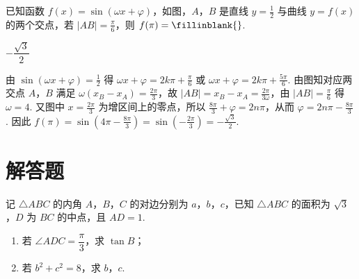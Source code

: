\begin{problem}
已知函数 \(f(x)=\sin(\omega x+\varphi)\)，如图，\(A\)，\(B\) 是直线 \(y=\frac12\) 与曲线 \(y=f(x)\) 的两个交点，若 \(|AB|=\frac{\pi}{6}\)，则 \(f(\pi)=\fillinblank{}\).

\end{problem}

\begin{answer}
\(-\dfrac{\sqrt3}{2}\)
\end{answer}

\begin{solution}
由 \(\sin(\omega x+\varphi)=\frac12\) 得
\(\omega x+\varphi=2k\pi+\frac{\pi}{6}\) 或 \(\omega x+\varphi=2k\pi+\frac{5\pi}{6}\).
由图知对应两交点 \(A\)，\(B\) 满足 \(\omega(x_B-x_A)=\frac{2\pi}{3}\)，故 \(|AB|=x_B-x_A=\frac{2\pi}{3\omega}\)，由 \(|AB|=\frac{\pi}{6}\) 得 \(\omega=4\).
又图中 \(x=\frac{2\pi}{3}\) 为增区间上的零点，所以 \(\frac{8\pi}{3}+\varphi=2n\pi\)，从而 \(\varphi=2n\pi-\frac{8\pi}{3}\).
因此
\(f(\pi)=\sin\left(4\pi-\frac{8\pi}{3}\right)=\sin\left(-\frac{2\pi}{3}\right)=-\frac{\sqrt3}{2}\).

\end{solution}
\section{解答题}

\begin{problem}
记 \(\triangle ABC\) 的内角 \(A\)，\(B\)，\(C\) 的对边分别为 \(a\)，\(b\)，\(c\)，已知 \(\triangle ABC\) 的面积为 \(\sqrt3\)，\(D\) 为 \(BC\) 的中点，且 \(AD=1\).

\begin{enumerate}
\item 若 \(\angle ADC=\dfrac{\pi}{3}\)，求 \(\tan B\)；
\item 若 \(b^2+c^2=8\)，求 \(b\)，\(c\).
\end{enumerate}
\end{problem}

